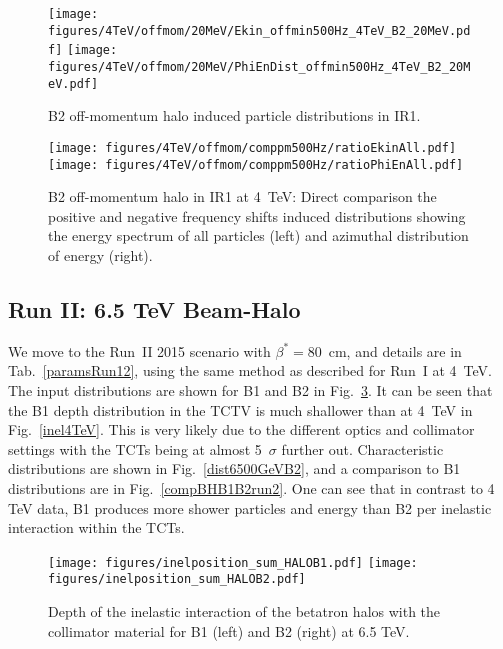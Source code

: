 \begin{figure}
\begin{center}
  \texttt{[image: figures/4TeV/offmom/20MeV/Ekin\_offmin500Hz\_4TeV\_B2\_20MeV.pdf]}
  \texttt{[image: figures/4TeV/offmom/20MeV/PhiEnDist\_offmin500Hz\_4TeV\_B2\_20MeV.pdf]}
\end{center}
\vspace{-0.6cm}
 \caption{B2 off-momentum halo induced particle distributions in IR1.
  \label{offmom4TeV}}
\end{figure}

\begin{figure}
  \centering
  \texttt{[image: figures/4TeV/offmom/comppm500Hz/ratioEkinAll.pdf]}
  \texttt{[image: figures/4TeV/offmom/comppm500Hz/ratioPhiEnAll.pdf]}
  \caption{B2 off-momentum halo in IR1 at 4~TeV: Direct comparison the positive and negative frequency shifts induced distributions showing the energy spectrum of all particles (left) and azimuthal distribution of energy (right).
    \label{compPM}}
\end{figure}

\subsection{Run II: 6.5 TeV Beam-Halo}

We move to the Run~II 2015 scenario with $\beta^* = 80$~cm, and details are in Tab.~\ref{paramsRun12}, using the same method as described for Run~I at 4~TeV. The input distributions are shown for B1 and B2 in Fig.~\ref{inel6.5}. It can be seen that the B1 depth distribution in the TCTV is much shallower than at 4~TeV in Fig.~\ref{inel4TeV}. This is very likely due to the different optics and collimator settings with the TCTs being at almost 5~$\sigma$ further out. Characteristic distributions are shown in Fig.~\ref{dist6500GeVB2}, and a comparison to B1 distributions are in Fig.~\ref{compBHB1B2run2}. One can see that in contrast to 4 TeV data, B1 produces more shower particles and energy than B2 per inelastic interaction within the TCTs. 


\begin{figure}[!htb]
\begin{center}
\texttt{[image: figures/inelposition\_sum\_HALOB1.pdf]}
\texttt{[image: figures/inelposition\_sum\_HALOB2.pdf]}
\end{center}
 \caption{Depth of the inelastic interaction of the betatron halos with the collimator material for B1 (left) and B2 (right) at 6.5 TeV.
  \label{inel6.5}}
\end{figure}


